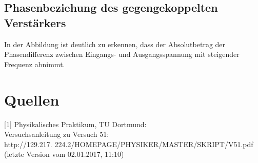 \documentclass[]{scrartcl}
\let\oldsection\section
\renewcommand\section{\clearpage\oldsection}
\begin{document}
\subsection{Phasenbeziehung des gegengekoppelten Verstärkers}
In der Abbildung ist deutlich zu erkennen, dass der Absolutbetrag der Phasendifferenz zwischen Eingangs- und Ausgangsspannung mit steigender Frequenz abnimmt. 

\section{Quellen}
{[1]} Physikalisches Praktikum, TU Dortmund: \\
Versuchsanleitung zu Versuch 51: \\
http://129.217.
224.2/HOMEPAGE/PHYSIKER/MASTER/SKRIPT/V51.pdf (letzte Version vom 02.01.2017, 11:10)\\
\end{document}
